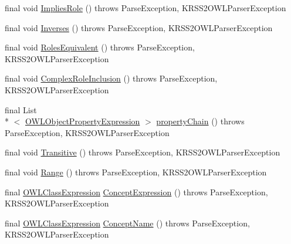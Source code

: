 \begin{DoxyCompactItemize}
final void \hyperlink{classde_1_1uulm_1_1ecs_1_1ai_1_1owlapi_1_1krssparser_1_1_k_r_s_s2_parser_ac7f20be942ce8a51fd3a6c6ae04f3e49}{Implies\-Role} ()  throws Parse\-Exception, K\-R\-S\-S2\-O\-W\-L\-Parser\-Exception 
\item 
final void \hyperlink{classde_1_1uulm_1_1ecs_1_1ai_1_1owlapi_1_1krssparser_1_1_k_r_s_s2_parser_a6a146670feeb75252669a224e09ab3d0}{Inverses} ()  throws Parse\-Exception, K\-R\-S\-S2\-O\-W\-L\-Parser\-Exception 
\item 
final void \hyperlink{classde_1_1uulm_1_1ecs_1_1ai_1_1owlapi_1_1krssparser_1_1_k_r_s_s2_parser_ad4f0e222331206b3e4ab183dc04e3011}{Roles\-Equivalent} ()  throws Parse\-Exception, K\-R\-S\-S2\-O\-W\-L\-Parser\-Exception 
\item 
final void \hyperlink{classde_1_1uulm_1_1ecs_1_1ai_1_1owlapi_1_1krssparser_1_1_k_r_s_s2_parser_a39f78b4532514a13776eb23eb2a44026}{Complex\-Role\-Inclusion} ()  throws Parse\-Exception,     K\-R\-S\-S2\-O\-W\-L\-Parser\-Exception 
\item 
final List\\*
$<$ \hyperlink{interfaceorg_1_1semanticweb_1_1owlapi_1_1model_1_1_o_w_l_object_property_expression}{O\-W\-L\-Object\-Property\-Expression} $>$ \hyperlink{classde_1_1uulm_1_1ecs_1_1ai_1_1owlapi_1_1krssparser_1_1_k_r_s_s2_parser_a21af7006f91a6425bb32d3a54679650b}{property\-Chain} ()  throws Parse\-Exception,     K\-R\-S\-S2\-O\-W\-L\-Parser\-Exception 
\item 
final void \hyperlink{classde_1_1uulm_1_1ecs_1_1ai_1_1owlapi_1_1krssparser_1_1_k_r_s_s2_parser_ad3e2caf8423d14b42c3139520a7bd300}{Transitive} ()  throws Parse\-Exception, K\-R\-S\-S2\-O\-W\-L\-Parser\-Exception 
\item 
final void \hyperlink{classde_1_1uulm_1_1ecs_1_1ai_1_1owlapi_1_1krssparser_1_1_k_r_s_s2_parser_ae2125e956e811c7a51ca5ced5cda8999}{Range} ()  throws Parse\-Exception, K\-R\-S\-S2\-O\-W\-L\-Parser\-Exception 
\item 
final \hyperlink{interfaceorg_1_1semanticweb_1_1owlapi_1_1model_1_1_o_w_l_class_expression}{O\-W\-L\-Class\-Expression} \hyperlink{classde_1_1uulm_1_1ecs_1_1ai_1_1owlapi_1_1krssparser_1_1_k_r_s_s2_parser_a8030b447cc22859f9ba5ea21eb31b6d8}{Concept\-Expression} ()  throws Parse\-Exception,     K\-R\-S\-S2\-O\-W\-L\-Parser\-Exception 
\item 
final \hyperlink{interfaceorg_1_1semanticweb_1_1owlapi_1_1model_1_1_o_w_l_class_expression}{O\-W\-L\-Class\-Expression} \hyperlink{classde_1_1uulm_1_1ecs_1_1ai_1_1owlapi_1_1krssparser_1_1_k_r_s_s2_parser_acf36d493467f5047402e5b9cca5ccf99}{Concept\-Name} ()  throws Parse\-Exception,     K\-R\-S\-S2\-O\-W\-L\-Parser\-Exception 

\end{DoxyCompactItemize}
